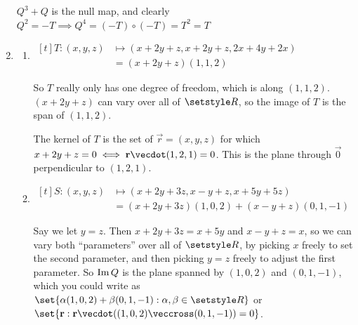\documentclass[fleqn,a4paper,11pt]{article}
\begin{document}
\begin{enumerate}[label=\textbf{\arabic*.}]
    \(Q^3 + Q\) is the null map, and clearly
    \(Q^2 = -T \implies Q^4 = (-T) \circ (-T) = T^2 = T\)
   \item
    \begin{enumerate}[label=(\alph*)]
     \item \(
      \begin{aligned}[t]
       T : (x, y, z) &\mapsto (x + 2y + z, x + 2y + z, 2x + 4y + 2x) \\
                     &= (x + 2y + z)(1, 1, 2)
      \end{aligned} \)

      So \(T\) really only has one degree of freedom, which is along
      \((1, 1, 2)\). \((x + 2y + z)\) can vary over all of \(\Reals\), so the
      image of \(T\) is the span of \((1, 1, 2)\).

      The kernel of \(T\) is the set of \(\vec r = (x, y, z)\) for which
      \(x + 2y + z = 0 \iff \vec r \vecdot (1, 2, 1) = 0\). This is the plane
      through \(\vec 0\) perpendicular to \((1, 2, 1)\).
     \item \(
      \begin{aligned}[t]
       S: (x, y, z) &\mapsto (x + 2y + 3z, x - y + z, x + 5y + 5z) \\
                    &= (x + 2y + 3z)(1, 0, 2) + (x - y + z)(0, 1, -1)
      \end{aligned} \)

      Say we let \(y = z\). Then \(x + 2y + 3z = x + 5y\) and \(x - y + z = x\),
      so we can vary both ``parameters'' over all of \(\Reals\), by picking
      \(x\) freely to set the second parameter, and then picking \(y = z\)
      freely to adjust the first parameter. So \(\operatorname{Im} Q\) is the plane spanned
      by \((1, 0, 2)\) and \((0, 1, -1)\), which you could write as
      \(\set{\alpha (1, 0, 2) + \beta (0, 1, -1) : \alpha, \beta \in \Reals}\)
      or \(\set{\vec r : \vec r \vecdot ((1, 0, 2) \veccross (0, 1, -1)) = 0}\).


\end{enumerate}
\end{enumerate}
\end{document}
